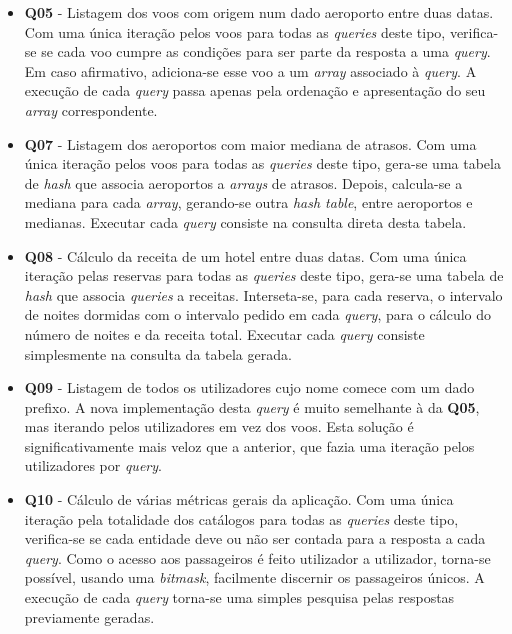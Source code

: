 \documentclass[11pt, a4paper]{article}
\begin{document}
\begin{itemize}
    \item \textbf{Q05} - Listagem dos voos com origem num dado aeroporto entre duas datas. Com uma
                         única iteração pelos voos para todas as \emph{queries} deste tipo,
                         verifica-se se cada voo cumpre as condições para ser parte da resposta
                         a uma \emph{query}. Em caso afirmativo, adiciona-se esse voo a um
                         \emph{array} associado à \emph{query}. A execução de cada \emph{query}
                         passa apenas pela ordenação e apresentação do seu \emph{array}
                         correspondente.

    \item \textbf{Q07} - Listagem dos aeroportos com maior mediana de atrasos. Com uma única
                         iteração pelos voos para todas as \emph{queries} deste tipo, gera-se uma
                         tabela de \emph{hash} que associa aeroportos a \emph{arrays} de atrasos.
                         Depois, calcula-se a mediana para cada \emph{array}, gerando-se outra
                         \emph{hash table}, entre aeroportos e medianas. Executar cada \emph{query}
                         consiste na consulta direta desta tabela.

    \item \textbf{Q08} - Cálculo da receita de um hotel entre duas datas. Com uma única iteração
                         pelas reservas para todas as \emph{queries} deste tipo, gera-se uma tabela
                         de \emph{hash} que associa \emph{queries} a receitas. Interseta-se, para
                         cada reserva, o intervalo de noites dormidas com o intervalo pedido em cada
                         \emph{query}, para o cálculo do número de noites e da receita total.
                         Executar cada \emph{query} consiste simplesmente na consulta da tabela
                         gerada.

    \item \textbf{Q09} - Listagem de todos os utilizadores cujo nome comece com um dado prefixo. A
                         nova implementação desta \emph{query} é muito semelhante à da \textbf{Q05},
                         mas iterando pelos utilizadores em vez dos voos. Esta solução é
                         significativamente mais veloz que a anterior, que fazia uma iteração pelos
                         utilizadores por \emph{query}.

    \item \textbf{Q10} - Cálculo de várias métricas gerais da aplicação. Com uma única iteração pela
                         totalidade dos catálogos para todas as \emph{queries} deste tipo,
                         verifica-se se cada entidade deve ou não ser contada para a resposta a cada
                         \emph{query}. Como o acesso aos passageiros é feito utilizador a
                         utilizador, torna-se possível, usando uma \emph{bitmask}, facilmente
                         discernir os passageiros únicos. A execução de cada \emph{query} torna-se
                         uma simples pesquisa pelas respostas previamente geradas.
\end{itemize}
\end{document}
